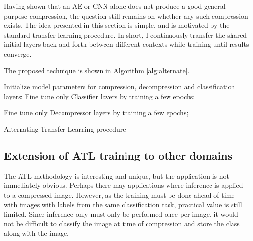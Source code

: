 \documentclass[twoside,11pt]{article}
\begin{document}
Having shown that an AE or CNN alone does not produce a good general-purpose compression,
the question still remains on whether any such compression exists. 
The idea presented in this section is simple, and is motivated by 
the standard transfer learning procedure. In short, I continuously transfer the shared
initial layers back-and-forth between different contexts while training until results converge. 

The proposed technique is shown in Algorithm \ref{alg:alternate}.

\begin{algorithm}[H]
\SetAlgoLined
{}
 Initialize model parameters for compression, decompression and classification layers;
 Fine tune only Classifier layers by training a few epochs;

 Fine tune only Decompressor layers by training a few epochs;
 \caption{Alternating Transfer Learning procedure}
 \label{alg:alternate}
\end{algorithm}


\subsection{Extension of ATL training to other domains}

The ATL methodology is interesting and unique, but the application is not immediately obvious.
Perhaps there may applications where inference is applied to a compressed image. 
However, as the training must be done ahead of time with images with labels from the 
same classification task, practical value is still limited. Since inference only must
only be performed once per image, it would not be difficult to classify the image at time of 
compression and store the class along with the image.
\end{document}
